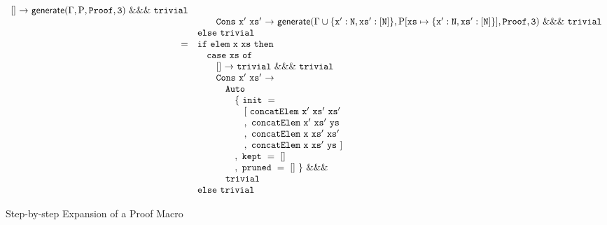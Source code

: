 \begin{figure*}
\begin{minipage}{\textwidth}
\begin{align*}
\begin{array}{rl}
            \mathtt{[]}~\mathtt{\rightarrow}~\mathsf{generate}(\Gamma, \mathrm{P}, \mathtt{Proof}, \mathtt{3})~\mathtt{\&\&\&}~\mathtt{trivial}
            \\& \hspace{2em}
            \mathtt{Cons~x'~xs'}~\mathtt{\rightarrow}~\mathsf{generate}(\Gamma\cup \{\mathtt{x'}:\mathtt{N}, \mathtt{xs'}:\mathtt{[N]}\}, \mathrm{P}[ \mathtt{xs} \mapsto \{ \mathtt{x'}:\mathtt{N}, \mathtt{xs'}:\mathtt{[N]} \} ], \mathtt{Proof}, \mathtt{3})~\mathtt{\&\&\&}~\mathtt{trivial}
        \\& \mathtt{else}~\mathtt{trivial}
      \\ =&
        \mathtt{if}~\mathtt{elem~x~xs}~\mathtt{then}
        \\& \hspace{1em} 
          \mathtt{case}~\mathtt{xs}~\mathtt{of}
          \\& \hspace{2em}
            \mathtt{[]}~\mathtt{\rightarrow}~\mathtt{trivial}~\mathtt{\&\&\&}~\mathtt{trivial}
            \\& \hspace{2em}
            \mathtt{Cons~x'~xs'}~\mathtt{\rightarrow}
            \\& \hspace{3em} \mathtt{Auto}
            \\& \hspace{4em} \mathtt{\{~init~=}
            \\& \hspace{5em} \mathtt{[~concatElem~x'~xs'~xs'}
            \\& \hspace{5em} \mathtt{,~concatElem~x'~xs'~ys}
            \\& \hspace{5em} \mathtt{,~concatElem~x~xs'~xs'}
            \\& \hspace{5em} \mathtt{,~concatElem~x~xs'~ys~]}
            \\& \hspace{4em} \mathtt{,~kept~=~[]}
            \\& \hspace{4em} \mathtt{,~pruned~=~[]~\}} ~ \mathtt{\&\&\&}
            \\& \hspace{3em} \mathtt{trivial}
        \\& \mathtt{else}~\mathtt{trivial}
    \end{array} \end{align*}
  \end{minipage}
  \caption{Step-by-step Expansion of a Proof Macro}
  \label{fig:step-by-step}
\end{figure*}

